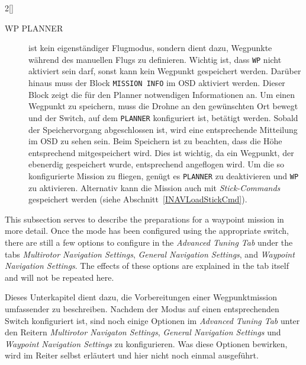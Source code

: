 \begin{paracol}{2}[]
\colger

\begin{description}
	\item[WP PLANNER] ist kein eigenständiger Flugmodus, sondern dient dazu, Wegpunkte während des manuellen Flugs zu definieren. Wichtig ist, dass \texttt{WP} nicht aktiviert sein darf, sonst kann kein Wegpunkt gespeichert werden. Darüber hinaus muss der Block \texttt{MISSION INFO} im OSD aktiviert werden. Dieser Block zeigt die für den Planner notwendigen Informationen an. Um einen Wegpunkt zu speichern, muss die Drohne an den gewünschten Ort bewegt und der Switch, auf dem \texttt{PLANNER} konfiguriert ist, betätigt werden. Sobald der Speichervorgang abgeschlossen ist, wird eine entsprechende Mitteilung im OSD zu sehen sein. Beim Speichern ist zu beachten, dass die Höhe entsprechend mitgespeichert wird. Dies ist wichtig, da ein Wegpunkt, der ebenerdig gespeichert wurde, entsprechend angeflogen wird. Um die so konfigurierte Mission zu fliegen, genügt es \texttt{PLANNER} zu deaktivieren und \texttt{WP} zu aktivieren. Alternativ kann die Mission auch mit \textsl{Stick-Commands} gespeichert werden (siehe Abschnitt~\ref{INAVLoadStickCmd}).
\end{description}

 \colende

\renewcommand{\deutschertitel}{Wegpunktmissionen mit INAV konfigurieren}
\renewcommand{\englischertitel}{Configure Waypoint Missions with INAV}
\makrounterabschnitt
\label{INAVWaypoint}

This subsection serves to describe the preparations for a waypoint mission in more detail. Once the mode has been configured using the appropriate switch, there are still a few options to configure in the \textsl{Advanced Tuning Tab} under the tabs \textsl{Multirotor Navigation Settings}, \textsl{General Navigation Settings}, and \textsl{Waypoint Navigation Settings}. The effects of these options are explained in the tab itself and will not be repeated here.

\colger

Dieses Unterkapitel dient dazu, die Vorbereitungen einer Wegpunktmission umfassender zu beschreiben. Nachdem der Modus auf einen entsprechenden Switch konfiguriert ist, sind noch einige Optionen im \textsl{Advanced Tuning Tab} unter den Reitern \textsl{Multirotor Navigaton Settings}, \textsl{General Navigation Settings} und \textsl{Waypoint Navigation Settings} zu konfigurieren. Was diese Optionen bewirken, wird im Reiter selbst erläutert und hier nicht noch einmal ausgeführt.


\end{paracol}

